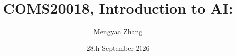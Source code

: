 \usepackage{amsmath, amssymb, graphicx}
\usepackage[]{algorithm2e}
\usepackage{pdfpages}
\usepackage{bm}
\usepackage{relsize}
\usepackage[british]{babel}
\usepackage{tikz,tikzsymbols}
\usepackage{pgfplots}
\pgfplotsset{compat=1.17}
\usepackage{hyperref}
\usepackage{cancel}
\usepackage{caption,subcaption}
\usepackage{adjustbox}
\usepackage{overpic}
\usepackage[UKenglish]{isodate}

\usetikzlibrary{arrows,decorations.markings,positioning}

\newcommand{\bs}{\boldsymbol}


\hypersetup{colorlinks,linkcolor=,urlcolor=blue}
\newenvironment{titledslide}[1]{\begin{frame}\frametitle{#1}}{\end{frame}}



\author{Mengyan Zhang}

\title{COMS20018, Introduction to AI:\\ \vspace{5pt} \lecttitle}

\date{28th September 2026}

